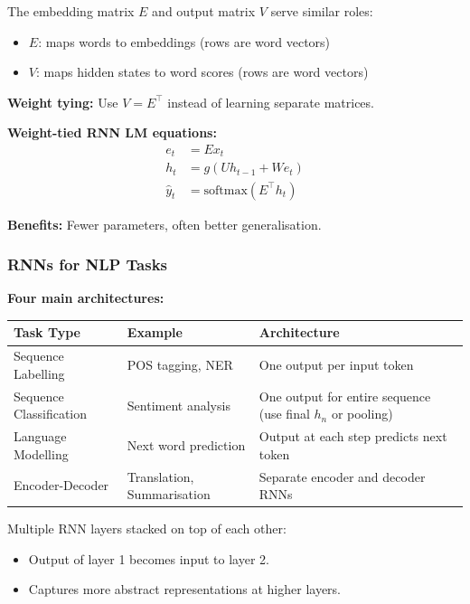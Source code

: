 \begin{defbox}
The embedding matrix $E$ and output matrix $V$ serve similar roles:
\begin{itemize}
  \item $E$: maps words to embeddings (rows are word vectors)
  \item $V$: maps hidden states to word scores (rows are word vectors)
\end{itemize}

\textbf{Weight tying:} Use $V = E^\top$ instead of learning separate matrices.

\textbf{Weight-tied RNN LM equations:}
\begin{align*}
e_t &= E x_t \\
h_t &= g(U h_{t-1} + W e_t) \\
\hat{y}_t &= \text{softmax}(E^\top h_t)
\end{align*}

\textbf{Benefits:} Fewer parameters, often better generalisation.
\end{defbox}

\bigseparator

\subsubsection{RNNs for NLP Tasks}

\textbf{Four main architectures:}

\begin{center}
\renewcommand{\arraystretch}{1.3}
\begin{tabular}{@{} l p{4cm} p{6cm} @{}}
\toprule
\textbf{Task Type} & \textbf{Example} & \textbf{Architecture} \\
\midrule
Sequence Labelling & POS tagging, NER & One output per input token \\
Sequence Classification & Sentiment analysis & One output for entire sequence (use final $h_n$ or pooling) \\
Language Modelling & Next word prediction & Output at each step predicts next token \\
Encoder-Decoder & Translation, Summarisation & Separate encoder and decoder RNNs \\
\bottomrule
\end{tabular}
\end{center}

\begin{defbox}
Multiple RNN layers stacked on top of each other:
\begin{itemize}
  \item Output of layer 1 becomes input to layer 2.
  \item Captures more abstract representations at higher layers.
\end{itemize}
\end{defbox}

